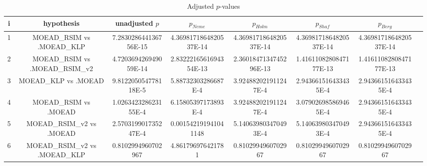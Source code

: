 \documentclass[a4paper,10pt]{article}
\begin{document}
\begin{landscape}
\begin{table}[!htp]
\centering\tiny
\caption{Adjusted $p$-values}
\begin{tabular}{cccccccc}
i&hypothesis&unadjusted $p$&$p_{Neme}$&$p_{Holm}$&$p_{Shaf}$&$p_{Berg}$\\
\hline
1&MOEAD_RSIM vs .MOEAD_KLP&7.283028644136756E-15&4.3698171864820537E-14&4.3698171864820537E-14&4.3698171864820537E-14&4.3698171864820537E-14\\
2&MOEAD_RSIM vs .MOEAD_RSIM_v2&4.720369426949059E-14&2.8322216561694354E-13&2.3601847134745296E-13&1.4161108280847177E-13&1.4161108280847177E-13\\
3&MOEAD_KLP vs .MOEAD&9.812205054778118E-5&5.88732303286687E-4&3.924882021911247E-4&2.943661516433435E-4&2.943661516433435E-4\\
4&MOEAD_RSIM vs .MOEAD&1.026342328623155E-4&6.15805397173893E-4&3.924882021911247E-4&3.079026985869465E-4&2.943661516433435E-4\\
5&MOEAD_RSIM_v2 vs .MOEAD&2.570319901735247E-4&0.001542191941041148&5.140639803470493E-4&5.140639803470493E-4&2.943661516433435E-4\\
6&MOEAD_RSIM_v2 vs .MOEAD_KLP&0.8102994960702967&4.861796976421781&0.8102994960702967&0.8102994960702967&0.8102994960702967\\
\hline
\end{tabular}
\end{table}

\end{landscape}
\end{document}
